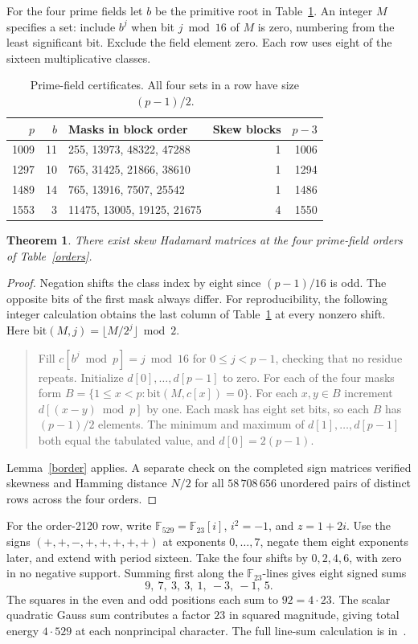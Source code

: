 \documentclass[11pt]{article}
\newtheorem{theorem}{Theorem}
\newcommand{\F}{\mathbb F}
\begin{document}
For the four prime fields let $b$ be the primitive root in Table~\ref{masks}. An integer $M$ specifies a set: include $b^j$ when bit $j\bmod16$ of $M$ is zero, numbering from the least significant bit. Exclude the field element zero. Each row uses eight of the sixteen multiplicative classes.
\begin{table}[ht]
\centering
\begin{tabular}{rrlrr}
\toprule $p$ & $b$ & Masks in block order & Skew blocks & $p-3$\\
\midrule
1009&11&255, 13973, 48322, 47288&1&1006\\
1297&10&765, 31425, 21866, 38610&1&1294\\
1489&14&765, 13916, 7507, 25542&1&1486\\
1553&3&11475, 13005, 19125, 21675&4&1550\\
\bottomrule
\end{tabular}
\caption{Prime-field certificates. All four sets in a row have size $(p-1)/2$.}\label{masks}
\end{table}
\begin{theorem}
There exist skew Hadamard matrices at the four prime-field orders of Table~\ref{orders}.
\end{theorem}
\begin{proof}
Negation shifts the class index by eight since $(p-1)/16$ is odd. The opposite bits of the first mask always differ. For reproducibility, the following integer calculation obtains the last column of Table~\ref{masks} at every nonzero shift. Here $\mathrm{bit}(M,j)=\lfloor M/2^j\rfloor\bmod2$.
\begin{quote}\small
Fill $c[b^j\bmod p]=j\bmod16$ for $0\le j<p-1$, checking that no residue repeats. Initialize $d[0],\ldots,d[p-1]$ to zero. For each of the four masks form $B=\{1\le x<p:\mathrm{bit}(M,c[x])=0\}$. For each $x,y\in B$ increment $d[(x-y)\bmod p]$ by one. Each mask has eight set bits, so each $B$ has $(p-1)/2$ elements. The minimum and maximum of $d[1],\ldots,d[p-1]$ both equal the tabulated value, and $d[0]=2(p-1)$.
\end{quote}
Lemma~\ref{border} applies. A separate check on the completed sign matrices verified skewness and Hamming distance $N/2$ for all $58\,708\,656$ unordered pairs of distinct rows across the four orders.
\end{proof}

For the order-2120 row, write $\F_{529}=\F_{23}[i]$, $i^2=-1$, and $z=1+2i$. Use the signs $(+,+,-,+,+,+,+,+)$ at exponents $0,\ldots,7$, negate them eight exponents later, and extend with period sixteen. Take the four shifts by $0,2,4,6$, with zero in no negative support. Summing first along the $\F_{23}$-lines gives eight signed sums
\[
 9,\ 7,\ 3,\ 3,\ 1,\ -3,\ -1,\ 5.
\]
The squares in the even and odd positions each sum to $92=4\cdot23$. The scalar quadratic Gauss sum contributes a factor $23$ in squared magnitude, giving total energy $4\cdot529$ at each nonprincipal character. The full line-sum calculation is in~\cite{Kline}.
\end{document}

